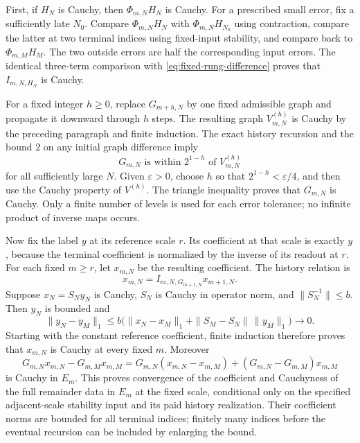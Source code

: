First, if $H_N$ is Cauchy, then $\Phi_{m,N}H_N$ is Cauchy.
For a prescribed small error, fix a sufficiently late $N_0$.
Compare $\Phi_{m,N}H_N$ with $\Phi_{m,N}H_{N_0}$ using contraction,
compare the latter at two terminal indices using fixed-input
stability, and compare back to $\Phi_{m,M}H_M$. The two outside
errors are half the corresponding input errors. The identical
three-term comparison with
\eqref{eq:fixed-rung-difference} proves that
$I_{m,N,H_N}$ is Cauchy.

For a fixed integer $h\ge0$, replace $G_{m+h,N}$ by one fixed
admissible graph and propagate it downward through $h$ steps.
The resulting graph $V_{m,N}^{(h)}$ is Cauchy by the preceding
paragraph and finite induction. The exact history recursion and
the bound $2$ on any initial graph difference imply
\[
                       G_{m,N}\text{ is within }2^{1-h}
                                      \text{ of }V_{m,N}^{(h)}
\]
for all sufficiently large $N$. Given $\varepsilon>0$, choose
$h$ so that $2^{1-h}<\varepsilon/4$, and then use the Cauchy
property of $V^{(h)}$. The triangle inequality proves that
$G_{m,N}$ is Cauchy. Only a finite number of levels is used for
each error tolerance; no infinite product of inverse maps occurs.

Now fix the label $y$ at its reference scale $r$. Its coefficient
at that scale is exactly $y$, because the terminal coefficient
is normalized by the inverse of its readout at $r$. For each
fixed $m\ge r$, let $x_{m,N}$ be the resulting coefficient.
The history relation is
\[
             x_{m,N}=I_{m,N,G_{m+1,N}}x_{m+1,N}.
\]
Suppose $x_N=S_N y_N$ is Cauchy, $S_N$ is Cauchy in operator
norm, and $\|S_N^{-1}\|\le b$. Then $y_N$ is bounded and
\[
 \|y_N-y_M\|_1
 \le b\bigl(\|x_N-x_M\|_1+\|S_M-S_N\|\,\|y_M\|_1\bigr)
                         \longrightarrow0.
\]
Starting with the constant reference coefficient, finite induction
therefore proves that $x_{m,N}$ is Cauchy at every fixed $m$.
Moreover
\[
 G_{m,N}x_{m,N}-G_{m,M}x_{m,M}
 =G_{m,N}(x_{m,N}-x_{m,M})
                  +(G_{m,N}-G_{m,M})x_{m,M}
\]
is Cauchy in $E_m$. This proves convergence of the coefficient and Cauchyness of the full
remainder data in $E_m$ at the fixed scale, conditional only
on the specified adjacent-scale stability input and its paid
history realization. Their coefficient norms are bounded for
all terminal indices; finitely many indices before the eventual
recursion can be included by enlarging the bound.

